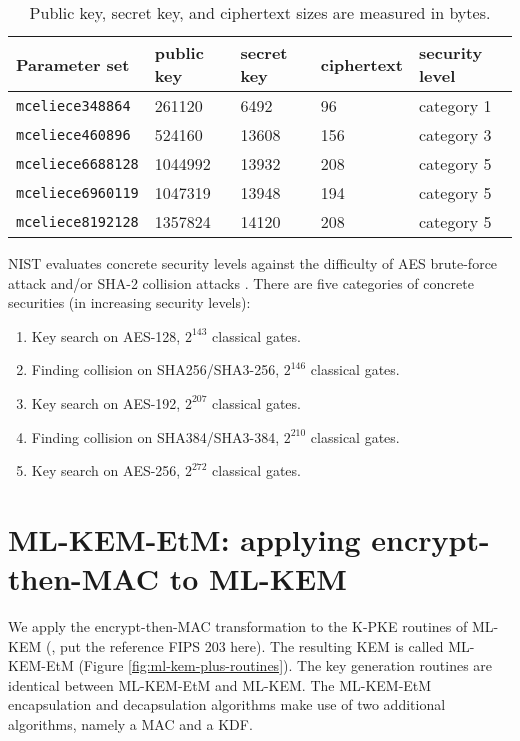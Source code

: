 \documentclass[runningheads]{llncs}
\begin{document}
\begin{table}[h]
    \centering
    \begin{tabular}{|p{8em}|p{5em}|p{5em}|p{5em}|p{8em}|}
        \hline
        Parameter set & public key & secret key & ciphertext & security level \cite{classic-mceliece-security-guide} \\
        \hline
        \texttt{mceliece348864} & 261120 & 6492 & 96 & category 1 \\
        \hline
        \texttt{mceliece460896} & 524160 & 13608 & 156 & category 3 \\
        \hline
        \texttt{mceliece6688128} & 1044992 & 13932 & 208 & category 5 \\
        \hline
        \texttt{mceliece6960119} & 1047319 & 13948 & 194 & category 5 \\
        \hline
        \texttt{mceliece8192128} & 1357824 & 14120 & 208 & category 5 \\
        \hline
    \end{tabular}
    \caption{Public key, secret key, and ciphertext sizes are measured in bytes.}\label{tab:classic-mceliece-parameter-sets}
\end{table}

NIST evaluates concrete security levels against the difficulty of AES brute-force attack and/or SHA-2 collision attacks \cite{NIST_PQC_Evaluation}. There are five categories of concrete securities (in increasing security levels): \begin{enumerate}
    \item Key search on AES-128, $2^{143}$ classical gates.
    \item Finding collision on SHA256/SHA3-256, $2^{146}$ classical gates.
    \item Key search on AES-192, $2^{207}$ classical gates.
    \item Finding collision on SHA384/SHA3-384, $2^{210}$ classical gates.
    \item Key search on AES-256, $2^{272}$ classical gates.
\end{enumerate}

\section{ML-KEM-EtM: applying encrypt-then-MAC to ML-KEM}\label{sec:applying-encrypt-then-mac-to-ml-kem}
We apply the encrypt-then-MAC transformation to the K-PKE routines of ML-KEM ({\color{blue}, put the reference FIPS 203 here}). The resulting KEM is called ML-KEM-EtM (Figure \ref{fig:ml-kem-plus-routines}). The key generation routines are identical between ML-KEM-EtM and ML-KEM. The ML-KEM-EtM   encapsulation and decapsulation algorithms make use of two additional algorithms, namely a {\sf MAC} and a {\sf KDF}.
\end{document}
